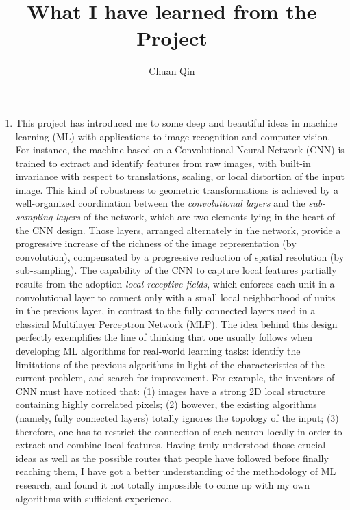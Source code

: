 \documentclass[11pt, oneside]{article}   	%
\title{What I have learned from the Project}
\author{Chuan Qin}
\begin{document}
\maketitle
\begin{enumerate}
\item This project has introduced me to some deep and beautiful ideas in machine learning (ML) with applications to image recognition and computer vision. For instance, the machine based on a Convolutional Neural Network (CNN) is trained to extract and identify features from raw images, with built-in invariance with respect to translations, scaling, or local distortion of the input image. This kind of robustness to geometric transformations is achieved by a well-organized coordination between the \emph{convolutional layers} and the \emph{sub-sampling layers} of the network, which are two elements lying in the heart of the CNN design. Those layers, arranged alternately in the network, provide a progressive increase of the richness of the image representation (by convolution), compensated by a progressive reduction of spatial resolution (by sub-sampling). The capability of the CNN to capture local features partially results from the adoption \emph{local receptive fields}, which enforces each unit in a convolutional layer to connect only with a small local neighborhood of units in the previous layer, in contrast to the fully connected layers used in a classical Multilayer Perceptron Network (MLP). The idea behind this design perfectly exemplifies the line of thinking that one usually follows when developing ML algorithms for real-world learning tasks: identify the limitations of the previous algorithms in light of the characteristics of the current problem, and search for improvement. For example, the inventors of CNN must have noticed that: (1) images have a strong 2D local structure containing highly correlated pixels; (2) however, the existing algorithms (namely, fully connected layers) totally ignores the topology of the input; (3) therefore, one has to restrict the connection of each neuron locally in order to extract and combine local features. Having truly understood those crucial ideas as well as the possible routes that people have followed before finally reaching them, I have got a better understanding of the methodology of ML research, and found it not totally impossible to come up with my own algorithms with sufficient experience.
 

\end{enumerate}
\end{document}
